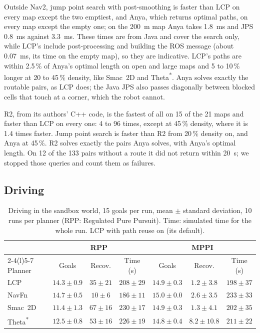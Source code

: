 \documentclass[conference]{IEEEtran}
\newcommand{\lcp}{LCP}
\begin{document}
Outside Nav2, jump point search with post-smoothing is faster than \lcp{} on every
map except the two emptiest, and Anya, which returns optimal paths, on every map
except the empty one; on the \SI{200}{m} map Anya takes \SI{1.8}{ms} and JPS
\SI{0.8}{ms} against \SI{3.3}{ms}. These times are from Java and cover the search
only, while \lcp{}'s include post-processing and building the ROS message (about
\SI{0.07}{ms}, its time on the empty map), so they are indicative. \lcp{}'s paths
are within 2.5\,\% of Anya's optimal length on open and large maps and 5 to 10\,\%
longer at 20 to 45\,\% density, like Smac~2D and Theta\textsuperscript{*}. Anya
solves exactly the routable pairs, as \lcp{} does; the Java JPS also passes
diagonally between blocked cells that touch at a corner, which the robot cannot.

R2, from its authors' C++ code, is the fastest of all on 15 of the 21 maps and
faster than \lcp{} on every one: 4 to 96 times, except at 45\,\% density, where it
is 1.4 times faster. Jump point search is faster than R2 from 20\,\% density on,
and Anya at 45\,\%. R2 solves exactly the pairs Anya
solves, with Anya's optimal length. On 12 of the 133 pairs without a route it did
not return within \SI{20}{s}; we stopped those queries and count them as failures.

\subsection{Driving}
\label{sec:driving}

\begin{table}[t]
\centering
\caption{Driving in the sandbox world, 15 goals per run, mean $\pm$ standard
deviation, 10 runs per planner (RPP: Regulated Pure Pursuit). Time: simulated
time for the whole run. \lcp{} with path reuse on (its default).}
\label{tab:driving}
\setlength{\tabcolsep}{2pt}
\footnotesize
\begin{tabular}{@{}lcccccc@{}}
\toprule
 & \multicolumn{3}{c}{RPP} & \multicolumn{3}{c}{MPPI} \\
\cmidrule(lr){2-4}\cmidrule(l){5-7}
Planner & Goals & Recov. & Time (s) & Goals & Recov. & Time (s) \\
\midrule
\lcp{}  & $14.3 \pm 0.9$ & $35 \pm 21$ & $208 \pm 29$ & $14.9 \pm 0.3$ & $1.2 \pm 3.8$ & $198 \pm 37$ \\
NavFn   & $14.7 \pm 0.5$ & $10 \pm 6$  & $186 \pm 11$ & $15.0 \pm 0.0$ & $2.6 \pm 3.5$ & $233 \pm 33$ \\
Smac~2D & $11.4 \pm 1.3$ & $67 \pm 16$ & $230 \pm 17$ & $14.9 \pm 0.3$ & $1.3 \pm 4.1$ & $202 \pm 35$ \\
Theta\textsuperscript{*} & $12.5 \pm 0.8$ & $53 \pm 16$ & $226 \pm 19$ & $14.8 \pm 0.4$ & $8.2 \pm 10.8$ & $211 \pm 22$ \\
\bottomrule
\end{tabular}
\end{table}
\end{document}
